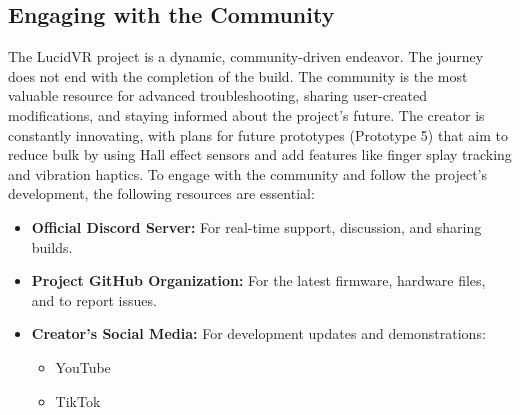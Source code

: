 \documentclass{article}
\begin{document}
\subsection{Engaging with the Community}
The LucidVR project is a dynamic, community-driven endeavor. The journey does not end with the completion of the build. The community is the most valuable resource for advanced troubleshooting, sharing user-created modifications, and staying informed about the project's future. The creator is constantly innovating, with plans for future prototypes (Prototype 5) that aim to reduce bulk by using Hall effect sensors and add features like finger splay tracking and vibration haptics. To engage with the community and follow the project's development, the following resources are essential:
\begin{itemize}
    \item \begin{minipage}[c]{0.15\textwidth}\end{minipage}\begin{minipage}[c]{0.8\textwidth}\textbf{Official Discord Server:} For real-time support, discussion, and sharing builds.\end{minipage}
    \item \begin{minipage}[c]{0.15\textwidth}\end{minipage}\begin{minipage}[c]{0.8\textwidth}\textbf{Project GitHub Organization:} For the latest firmware, hardware files, and to report issues.\end{minipage}
    \item \textbf{Creator's Social Media:} For development updates and demonstrations:
    \begin{itemize}
        \item \begin{minipage}[c]{0.15\textwidth}\end{minipage}\begin{minipage}[c]{0.8\textwidth}YouTube\end{minipage}
        \item \begin{minipage}[c]{0.15\textwidth}\end{minipage}\begin{minipage}[c]{0.8\textwidth}TikTok\end{minipage}
    \end{itemize}
\end{itemize}
\end{document}
